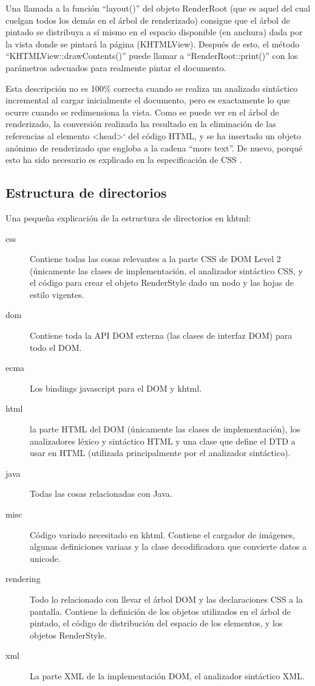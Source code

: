 Una llamada a la función ``layout()'' del objeto RenderRoot (que es aquel del cual cuelgan todos los demás en el árbol de renderizado) consigue que el árbol de pintado se distribuya a sí mismo en el espacio disponible (en anchura) dada por la vista donde se pintará la página (KHTMLView). Después de esto, el método ``KHTMLView::drawContents()'' puede llamar a ``RenderRoot::print()''  con los parámetros adecuados para realmente pintar el documento.

Esta descripción no es 100\% correcta cuando se realiza un analizado sintáctico incremental al cargar inicialmente el documento, pero es exactamente lo que ocurre cuando se redimensiona la vista. Como se puede ver en el árbol de renderizado, la conversión realizada ha resultado en la eliminación de las referencias al elemento <head>` del código HTML, y se ha insertado un objeto anónimo de renderizado que engloba a la cadena ``more text''. De nuevo, porqué esto ha sido necesario es explicado en la especificación de CSS \cite{css2.1}.


\subsection{Estructura de directorios}\label{khtml_dirs}

Una pequeña explicación de la estructura de directorios en khtml:

\begin{description}
 \item[css] Contiene todas las cosas relevantes a la parte CSS de DOM Level 2 (únicamente las clases de implementación, el analizador sintáctico CSS, y el código para crear el objeto RenderStyle dado un nodo y las hojas de estilo vigentes.
 \item[dom] Contiene toda la API DOM externa (las clases de interfaz DOM) para todo el DOM.
 \item[ecma] Los bindings javascript para el DOM y khtml.
 \item[html] la parte HTML del DOM (únicamente las clases de implementación), los analizadores léxico y sintáctico HTML y una clase que define el DTD a usar en HTML (utilizada principalmente por el analizador sintáctico).
 \item[java] Todas las cosas relacionadas con Java.
 \item[misc] Código variado necesitado en khtml.  Contiene el cargador de imágenes, algunas definiciones variaas y la clase decodificadora que convierte datos a unicode.
 \item[rendering] Todo lo relacionado con llevar el árbol DOM y las declaraciones CSS a la pantalla. Contiene la definición de los objetos utilizados en el árbol de pintado, el código de distribución del espacio de los elementos, y los objetos RenderStyle.
 \item[xml] La parte XML de la implementación DOM, el analizador sintáctico XML.
 \end{description}
 
